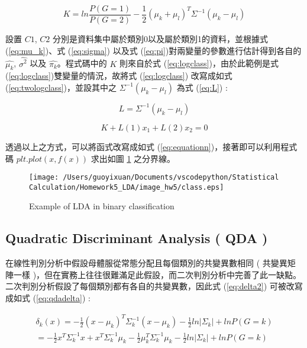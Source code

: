 \begin{equation}\label{eq:twologclass}
K = ln \frac{P(G=1)}{P(G=2)}-\frac{1}{2}(\mu_k+\mu_l)^{T}\Sigma^{-1}(\mu_k-\mu_l)
\end{equation}

設置 $C1$, $C2$ 分別是資料集中屬於類別0以及屬於類別1的資料，並根據式(\ref{eq:mu_k})、式 (\ref{eq:sigma}) 以及式 (\ref{eq:pi})對兩變量的參數進行估計得到各自的 $\hat{\mu_k}$, $\hat{\sigma^{2}}$ 以及 $\hat{\pi_k}$。程式碼中的 $K$ 則來自於式 (\ref{eq:logclass})，由於此範例是式 (\ref{eq:logclass})雙變量的情況，故將式 (\ref{eq:logclass}) 改寫成如式 (\ref{eq:twologclass})，並設其中之 $\Sigma^{-1}(\mu_k-\mu_l)$ 為式 (\ref{eq:L}) :

\begin{equation}\label{eq:L}
L=\Sigma^{-1}(\mu_k-\mu_l)
\end{equation}

\begin{equation}\label{eq:equationn}
K+L(1)x_1+L(2)x_2=0
\end{equation}

透過以上之方式，可以將函式改寫成如式 (\ref{eq:equationn})，接著即可以利用程式碼 $plt.plot(x, f(x))$ 求出如圖 \ref{fig:class of LDA} 之分界線。

\begin{figure}[H]
    \centering
        \texttt{[image: /Users/guoyixuan/Documents/vscodepython/Statistical Calculation/Homework5\_LDA/image\_hw5/class.eps]}
    \caption{Example of LDA in binary classification}
    \label{fig:class of LDA}
\end{figure}

\subsection{Quadratic Discriminant Analysis ( QDA )}

在線性判別分析中假設母體服從常態分配且每個類別的共變異數相同 ( 共變異矩陣一樣 )，但在實務上往往很難滿足此假設，而二次判別分析中完善了此一缺點。二次判別分析假設了每個類別都有各自的共變異數，因此式 (\ref{eq:delta2}) 可被改寫成如式 (\ref{eq:qdadelta}) :

\begin{equation}\label{eq:qdadelta}
\begin{split}
\delta_k(x)=-\frac{1}{2}(x-\mu_k)^{T}\Sigma_k^{-1}(x-\mu_k)-\frac{1}{2}ln \left| \Sigma_k \right|+ln P(G=k)\\
=-\frac{1}{2}x^{T}\Sigma_k^{-1}x+x^{T}\Sigma_k^{-1}\mu_k-\frac{1}{2}\mu_k^{T}\Sigma_k^{-1}\mu_k-\frac{1}{2}ln\left| \Sigma_k \right|+ln P(G=k)
\end{split}
\end{equation}

